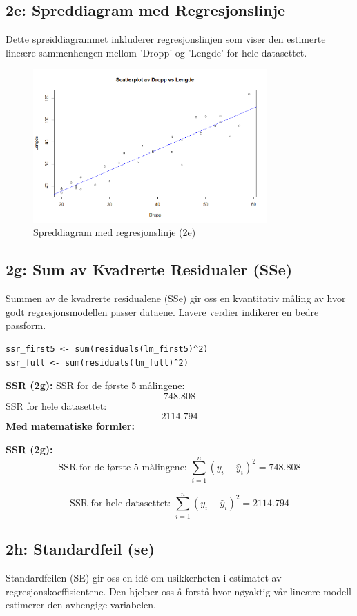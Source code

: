 \documentclass{article}
\begin{document}
\subsection{2e: Spreddiagram med Regresjonslinje}
Dette spreiddiagrammet inkluderer regresjonslinjen som viser den estimerte lineære sammenhengen mellom 'Dropp' og 'Lengde' for hele datasettet.

\begin{figure}[H]
    \centering
    \includegraphics[width=0.8\textwidth]{Rplot02.png}
    \caption{Spreddiagram med regresjonslinje (2e)}
\end{figure}

\subsection{2g: Sum av Kvadrerte Residualer (SSe)}
Summen av de kvadrerte residualene (SSe) gir oss en kvantitativ måling av hvor godt regresjonsmodellen passer dataene. Lavere verdier indikerer en bedre passform.

\begin{lstlisting}[style=Rstyle]
ssr_first5 <- sum(residuals(lm_first5)^2)
ssr_full <- sum(residuals(lm_full)^2)
\end{lstlisting}

\textbf{SSR (2g):} SSR for de første 5 målingene: \[ 748.808  \]
SSR for hele datasettet: \[ 2114.794 \]
\textbf{Med matematiske formler:}

\textbf{SSR (2g):}
\[ \text{SSR for de første 5 målingene: } \sum_{i=1}^{n} (y_i - \hat{y}_i)^2 = 748.808 \]

\[ \text{SSR for hele datasettet: } \sum_{i=1}^{n} (y_i - \hat{y}_i)^2 = 2114.794 \]

\subsection{2h: Standardfeil (se)}
Standardfeilen (SE) gir oss en idé om usikkerheten i estimatet av regresjonskoeffisientene. Den hjelper oss å forstå hvor nøyaktig vår lineære modell estimerer den avhengige variabelen.
\end{document}
